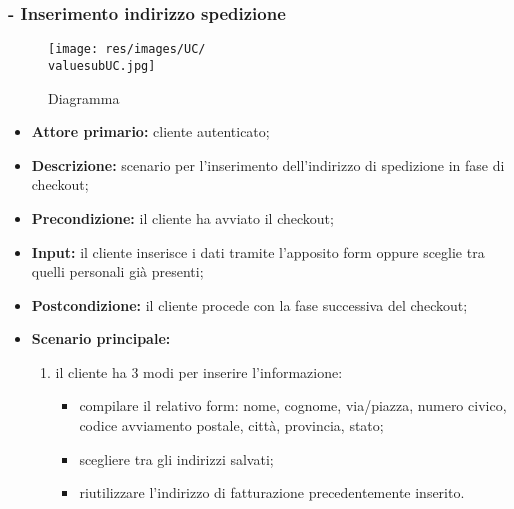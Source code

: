 \stepsubUserCase
\subsubsection{ - Inserimento indirizzo spedizione}
\begin{figure}[H]
    \centering
    \texttt{[image: res/images/UC/\\valuesubUC.jpg]}
    \caption{Diagramma }
\end{figure}
\begin{itemize}
    \item \textbf{Attore primario:} cliente autenticato;
    \item \textbf{Descrizione:} scenario per l'inserimento dell'indirizzo di spedizione in fase di checkout;
    \item \textbf{Precondizione:} il cliente ha avviato il checkout;
    \item \textbf{Input:} il cliente inserisce i dati tramite l'apposito form oppure sceglie tra quelli personali già presenti;
    \item \textbf{Postcondizione:} il cliente procede con la fase successiva del checkout;
    \item \textbf{Scenario principale:}
          \begin{enumerate}
              \item il cliente ha 3 modi per inserire l'informazione:
                    \begin{itemize}
                        \item compilare il relativo form: nome, cognome, via/piazza, numero civico, codice avviamento postale, città, provincia, stato;
                        \item scegliere tra gli indirizzi salvati;
                        \item riutilizzare l'indirizzo di fatturazione precedentemente inserito.
                    \end{itemize}
          \end{enumerate}
\end{itemize}

\stepsubUserCase
